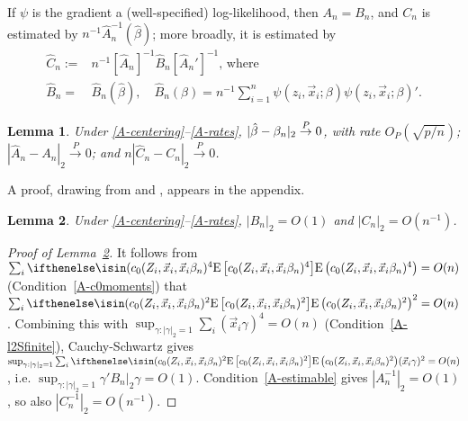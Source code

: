 \documentclass{article}
\newtheorem{lemma}{Lemma}
\theoremstyle{remark}
\begin{document}
If $\psi$ is the gradient a (well-specified) log-likelihood, then $A_{n}=B_{n}$, and $C_{n}$ is estimated by $n^{-1}\hat{A}_{n}^{-1}(\hat\beta)$; more broadly, it is estimated by 
\begin{align*}
\hat{C}_{n} :=& n^{-1} [\hat{A}_{n}]^{-1} \hat{B}_{n} [\hat{A}_{n}']^{-1},\, \text{where}\\
\hat{B}_{n}  =&  \hat{B}_n(\hat\beta), \quad \hat{B}_n(\beta) = n^{-1} \sum_{i=1}^{n} \psi(z_{i}, \vec{x}_{i};  {\beta} ) \psi(z_{i}, \vec{x}_{i};  {\beta} )'.  
\end{align*}

\begin{lemma} \label{lem:ChatC}
  Under \ref{A-centering}--\ref{A-rates}, $|\hat\beta - \beta_{n }|_{2} \stackrel{P}{\rightarrow} 0$, with rate $O_{P}\left( \sqrt{p/n} \right)$;   $|\hat{A}_{n} - A_{n}|_{2} \stackrel{P}{\rightarrow} 0$; and $n|\hat{C}_{n} - C_{n}|_{2} \stackrel{P}{\rightarrow} 0$. 
\end{lemma}

A proof, drawing from \citet{he2000parameters} and \citet{wang2011gee}, appears in the appendix.


\begin{lemma} \label{lem:C-rate}
  Under \ref{A-centering}--\ref{A-rates}, $|B_{n}|_{2} = O(1)$ and $|C_{n}|_{2} = O(n^{-1})$.
\end{lemma}

\begin{proof}[Proof of Lemma~\ref{lem:C-rate}]
  It follows from  $\sum_{i}\E{\psiC{Z_{i},\vec{x}_{i},
 \vec{x}_{i}\betatrue}^{4}} = O(n)$  (Condition~\ref{A-c0moments})
that $\sum_{i}\E{\psiC{Z_{i},\vec{x}_{i},
 \vec{x}_{i}\betatrue}^{2}}^{2} = O(n)$. Combining this with $\sup_{\gamma:
  |\gamma|_{2}=1} \sum_{i}(\vec{x}_{i}\gamma)^{4} = O(n)$
(Condition~\ref{A-l2Sfinite}), Cauchy-Schwartz gives $\sup_{\gamma:
  |\gamma|_{2}=1} \sum_{i} \E{\psiC{Z_{i},\vec{x}_{i},
 \vec{x}_{i}\betatrue}^{2}}(\vec{x}_{i}\gamma)^{2} = O(n)$, i.e.
 $\sup_{\gamma:
  |\gamma|_{2}=1} \gamma' B_{n}|_{2}\gamma =
O(1)$.   Condition~\ref{A-estimable} gives $|{A}_{n}^{-1}|_{2}=O(1)$, so also $|{C}_{n}^{-1}|_{2}=O(n^{-1})$.
\end{proof}
\end{document}
